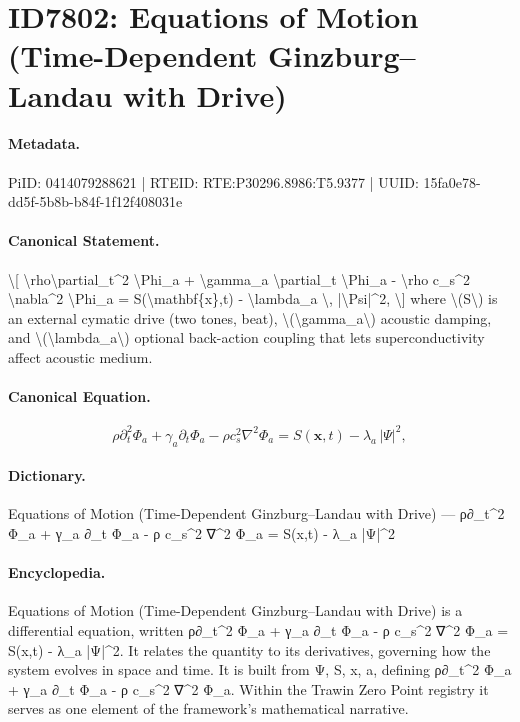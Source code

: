 \section*{ID7802: Equations of Motion (Time-Dependent Ginzburg–Landau with Drive)}
\paragraph{Metadata.}
PiID: 0414079288621 | RTEID: RTE:P30296.8986:T5.9377 | UUID: 15fa0e78-dd5f-5b8b-b84f-1f12f408031e

\paragraph{Canonical Statement.}
\textbackslash{}[ \textbackslash{}rho\textbackslash{}partial\_t\textasciicircum{}2 \textbackslash{}Phi\_a + \textbackslash{}gamma\_a \textbackslash{}partial\_t \textbackslash{}Phi\_a - \textbackslash{}rho c\_s\textasciicircum{}2 \textbackslash{}nabla\textasciicircum{}2 \textbackslash{}Phi\_a = S(\textbackslash{}mathbf\{x\},t) - \textbackslash{}lambda\_a \textbackslash{}, |\textbackslash{}Psi|\textasciicircum{}2, \textbackslash{}] where \textbackslash{}(S\textbackslash{}) is an external cymatic drive (two tones, beat), \textbackslash{}(\textbackslash{}gamma\_a\textbackslash{}) acoustic damping, and \textbackslash{}(\textbackslash{}lambda\_a\textbackslash{}) optional back-action coupling that lets superconductivity affect acoustic medium.

\paragraph{Canonical Equation.}
\[
\rho\partial_t^2 \Phi_a + \gamma_a \partial_t \Phi_a - \rho c_s^2 \nabla^2 \Phi_a = S(\mathbf{x},t) - \lambda_a \, |\Psi|^2,
\]

\paragraph{Dictionary.}
Equations of Motion (Time-Dependent Ginzburg–Landau with Drive) — ρ∂\_t\textasciicircum{}2 Φ\_a + γ\_a ∂\_t Φ\_a - ρ c\_s\textasciicircum{}2 ∇\textasciicircum{}2 Φ\_a = S(x,t) - λ\_a |Ψ|\textasciicircum{}2

\paragraph{Encyclopedia.}
Equations of Motion (Time-Dependent Ginzburg–Landau with Drive) is a differential equation, written ρ∂\_t\textasciicircum{}2 Φ\_a + γ\_a ∂\_t Φ\_a - ρ c\_s\textasciicircum{}2 ∇\textasciicircum{}2 Φ\_a = S(x,t) - λ\_a |Ψ|\textasciicircum{}2. It relates the quantity to its derivatives, governing how the system evolves in space and time. It is built from Ψ, S, x, a, defining ρ∂\_t\textasciicircum{}2 Φ\_a + γ\_a ∂\_t Φ\_a - ρ c\_s\textasciicircum{}2 ∇\textasciicircum{}2 Φ\_a. Within the Trawin Zero Point registry it serves as one element of the framework's mathematical narrative.
